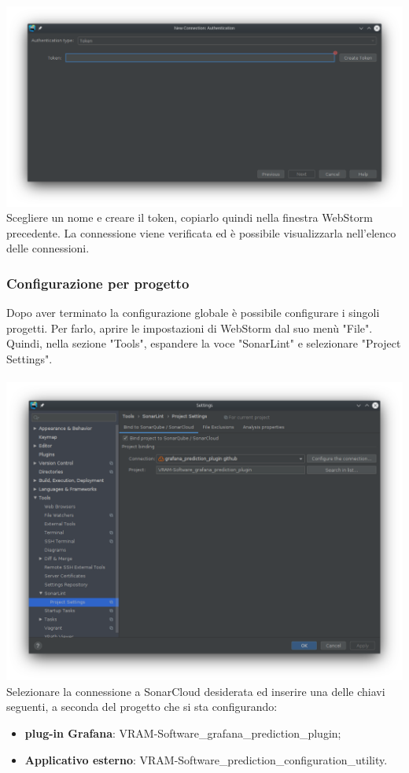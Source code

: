 \\
\\
\includegraphics[width=\textwidth,height=\textheight,keepaspectratio]{img/token.png}
\\
Scegliere un nome e creare il token, copiarlo quindi nella finestra WebStorm precedente.
La connessione viene verificata ed è possibile visualizzarla nell'elenco delle connessioni.
\subsubsection{Configurazione per progetto}
Dopo aver terminato la configurazione globale è possibile configurare i singoli progetti. Per farlo, aprire le impostazioni di WebStorm dal suo menù "File". Quindi, nella sezione "Tools", espandere la voce "SonarLint" e selezionare "Project Settings".
\\
\\
\includegraphics[width=\textwidth,height=\textheight,keepaspectratio]{img/sonarlint-project.png}
Selezionare la connessione a SonarCloud desiderata ed inserire una delle chiavi seguenti, a seconda del progetto che si sta configurando:
\begin{itemize}
	\item \textbf{plug-in Grafana}: VRAM-Software\_grafana\_prediction\_plugin;
	\item \textbf{Applicativo esterno}: VRAM-Software\_prediction\_configuration\_utility.
\end{itemize}

